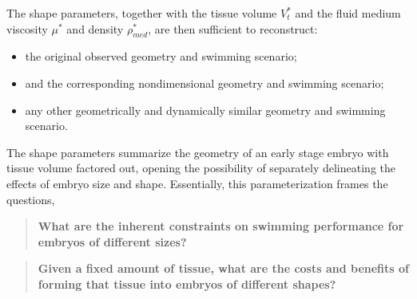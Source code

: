 \documentclass[10pt,a4paper]{article}
\def\Vts{V_t^*}
\begin{document}
The shape parameters, together with the tissue volume $\Vts$ and the fluid medium viscosity $\mu^*$ and density $\rho_{med}^*$, are then sufficient to reconstruct:
\begin{itemize}
	\item the original observed geometry and swimming scenario;
	\item and the corresponding nondimensional geometry and swimming scenario;
	\item any other geometrically and dynamically similar geometry and swimming scenario.
\end{itemize}
The shape parameters summarize the geometry of an early stage embryo with tissue volume factored out, opening the possibility of separately delineating the effects of embryo size and shape.
Essentially, this parameterization frames the questions,
\begin{quotation}
	\textbf{What are the inherent constraints on swimming performance for embryos of different sizes?}
\end{quotation}
\begin{quotation}
	\textbf{Given a fixed amount of tissue, what are the costs and benefits of forming that tissue into embryos of different shapes?}
\end{quotation}
\end{document}
